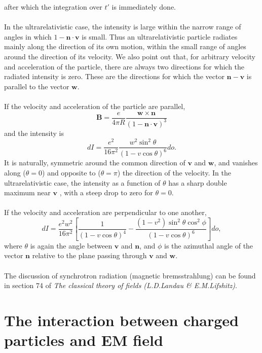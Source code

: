 after which the integration over $t'$ is immediately done.\\ \\
In the ultrarelativistic case, the intensity is large within the narrow range of angles in which $1-\bm{n}\cdot\bm{v}$ is small. Thus an ultrarelativistic particle radiates mainly along the direction of its own motion, within the small range  of angles around the direction of its velocity. We also point out that, for arbitrary velocity and acceleration of the particle, there are always two directions for which the radiated intensity is zero. These are the directions for
which the vector $\bm{n}-\bm{v}$ is parallel to the vector $\bm{w}$.\\ \\
If the velocity and acceleration of the particle are parallel,
\[\bm{B} = \frac{e}{4\pi R} \frac{\bm{w} \times \bm{n}}{(1-\bm{n}\cdot\bm{v})^3} \]
and the intensity is
\[dI = \frac{e^2}{16\pi^2} \frac{w^2 \sin^2 \theta}{(1-v\cos\theta)^6} do.\]
It is naturally, symmetric around the common direction of $\bm{v}$ and $\bm{w}$, and vanishes along ($\theta=0$) and opposite to ($\theta = \pi$) the direction of the velocity. In the ultrarelativistic case, the intensity as a function of $\theta$ has a sharp double maximum near $\bm{v}$ , with a steep drop to zero for $\theta = 0$.
\\ \\
If the velocity and acceleration are perpendicular to one another,
\[dI = \frac{e^2 w^2}{16\pi^2} \left[ \frac{1}{(1-v\cos\theta)^4} - \frac{(1-v^2)\sin^2\theta \cos^2\phi}{(1-v\cos\theta)^6} \right]do,\]
where $\theta$ is again the angle between $\bm{v}$ and $\bm{n}$, and $\phi$ is the azimuthal angle of the vector $\bm{n}$ relative to the plane passing through $\bm{v}$ and $\bm{w}$.
\\ \\
The discussion of synchrotron radiation (magnetic bremsstrahlung) can be found in section 74 of \emph{The classical theory of fields (L.D.Landau \& E.M.Lifshitz)}.

\section{The interaction between charged particles and EM field}
